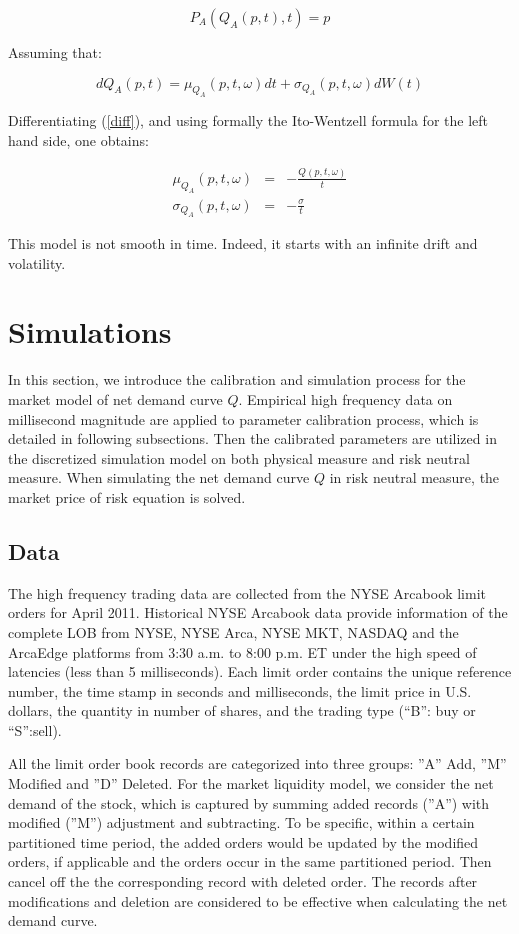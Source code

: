 \documentclass{article}
\begin{document}
\begin{equation}
P_{A}(Q_{A}(p,t),t)=p  \label{diff}
\end{equation}

Assuming that:

\begin{equation*}
dQ_{A}(p,t)=\mu _{Q_{A}}(p,t,\omega )dt+\sigma _{Q_{A}}(p,t,\omega )dW(t)
\end{equation*}

Differentiating (\ref{diff}), and using formally the Ito-Wentzell formula
for the left hand side, one obtains:

\begin{eqnarray*}
\mu _{Q_{A}}(p,t,\omega ) &=&-\frac{Q(p,t,\omega )}{t} \\
\sigma _{Q_{A}}(p,t,\omega ) &=&-\frac{\sigma }{t}
\end{eqnarray*}

This model is not smooth in time. Indeed, it starts with an infinite drift
and volatility.

\section{Simulations}
In this section, we introduce the calibration and simulation process for the market model of net demand curve $Q$. Empirical high frequency data on millisecond magnitude are applied to parameter calibration process, which is detailed in following subsections. Then the calibrated parameters are utilized in the discretized simulation model on both physical measure and risk neutral measure. When simulating the net demand curve $Q$ in risk neutral measure, the market price of risk equation is solved.

\subsection{Data}
The high frequency trading data are collected from the NYSE Arcabook limit orders for April 2011.
Historical NYSE Arcabook data provide information of the complete LOB from NYSE, NYSE Arca, NYSE MKT, NASDAQ and the ArcaEdge platforms from 3:30 a.m. to 8:00 p.m. ET
under the high speed of latencies (less than 5 milliseconds). Each limit order contains the unique reference number, the time stamp in seconds and milliseconds, the limit
price in U.S. dollars, the quantity in number of shares, and the trading type (“B”: buy or “S”:sell).

All the limit order book records are categorized into three groups: ''A'' Add, ''M'' Modified and ''D'' Deleted.
For the market liquidity model, we consider the net demand of the stock, which is captured by summing added records (''A'') with modified (''M'') adjustment and subtracting.
To be specific, within a certain partitioned time period, the added orders would be updated by the modified orders, if applicable and the orders occur in the same partitioned period.
Then cancel off the the corresponding record with deleted order. The records after modifications and deletion are considered to be effective when calculating the net demand curve.
\end{document}
